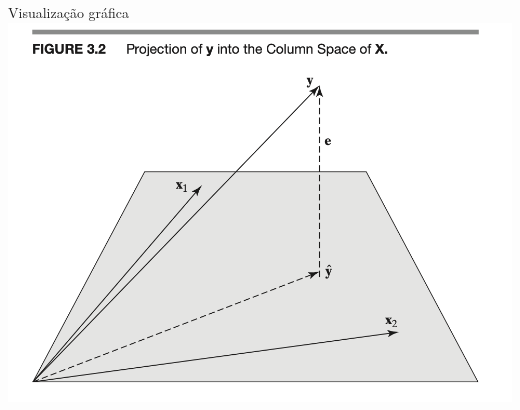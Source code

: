 \documentclass[11pt]{beamer}
\begin{document}
\begin{frame}{Visualização gráfica}
	\centering
	\includegraphics[scale=0.5]{plots/projecao.png}
\end{frame}
\end{document}
